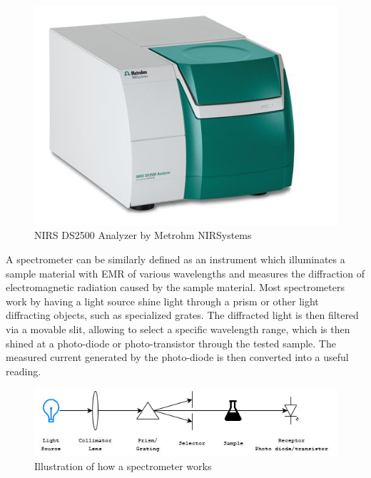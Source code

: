 \documentclass[twoside]{ctuthesis}
\theoremstyle{plain}
\theoremstyle{definition}
\theoremstyle{note}
\begin{document}
\begin{figure}[H]
	\centering
	\includegraphics[scale = 0.75]{spectrometer}
	\caption{NIRS DS2500 Analyzer by Metrohm NIRSystems}
\end{figure}

A spectrometer can be similarly defined as an instrument which illuminates a sample material with EMR of various wavelengths and measures the diffraction of electromagnetic radiation caused by the sample material. Most spectrometers work by having a light source shine light through a prism or other light diffracting objects, such as specialized grates. The diffracted light is then filtered via a movable slit, allowing to select a specific wavelength range, which is then shined at a photo-diode or photo-transistor through the tested sample. The measured current generated by the photo-diode is then converted into a useful reading.

\begin{figure}[H]
	\centering
	\includegraphics[scale = 0.7]{spectrometer_scheme}
	\caption{Illustration of how a spectrometer works}
\end{figure}
\end{document}
